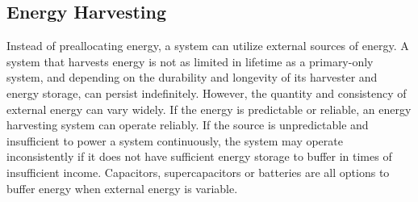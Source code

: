 \subsection{Energy Harvesting}
Instead of preallocating energy, a system can utilize external sources of energy.
A system that harvests energy is not as limited in lifetime as a primary-only system, and depending on the durability and longevity of its harvester and energy storage, can persist indefinitely.
However, the quantity and consistency of external energy can vary widely.
If the energy is predictable or reliable, an energy harvesting system can operate reliably.
If the source is unpredictable and insufficient to power a system continuously, the system may operate inconsistently if it does not have sufficient energy storage to buffer in times of insufficient income.
Capacitors, supercapacitors or batteries are all options to buffer energy when external energy is variable.

